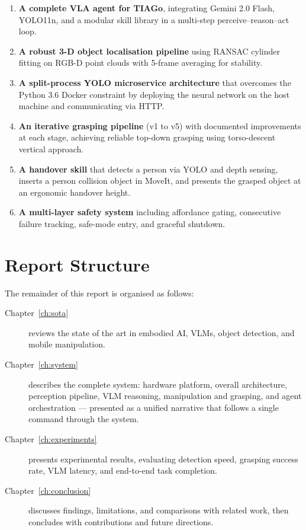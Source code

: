 \begin{enumerate}
  \item \textbf{A complete VLA agent for TIAGo}, integrating Gemini 2.0 Flash, YOLO11n,
        and a modular skill library in a multi-step perceive--reason--act loop.

  \item \textbf{A robust 3-D object localisation pipeline} using RANSAC cylinder
        fitting on RGB-D point clouds with 5-frame averaging for stability.

  \item \textbf{A split-process YOLO microservice architecture} that overcomes the
        Python 3.6 Docker constraint by deploying the neural network on the host machine
        and communicating via HTTP.

  \item \textbf{An iterative grasping pipeline} (v1 to v5) with documented improvements
        at each stage, achieving reliable top-down grasping using torso-descent vertical
        approach.

  \item \textbf{A handover skill} that detects a person via YOLO and depth sensing,
        inserts a person collision object in MoveIt, and presents the grasped object at
        an ergonomic handover height.

  \item \textbf{A multi-layer safety system} including affordance gating, consecutive
        failure tracking, safe-mode entry, and graceful shutdown.
\end{enumerate}

\section{Report Structure}

The remainder of this report is organised as follows:

\begin{description}
  \item[Chapter~\ref{ch:sota}] reviews the state of the art in embodied AI, VLMs,
        object detection, and mobile manipulation.
  \item[Chapter~\ref{ch:system}] describes the complete system: hardware platform,
        overall architecture, perception pipeline, VLM reasoning, manipulation and
        grasping, and agent orchestration --- presented as a unified narrative that
        follows a single command through the system.
  \item[Chapter~\ref{ch:experiments}] presents experimental results, evaluating
        detection speed, grasping success rate, VLM latency, and end-to-end task
        completion.
  \item[Chapter~\ref{ch:conclusion}] discusses findings, limitations, and comparisons
        with related work, then concludes with contributions and future directions.
\end{description}
